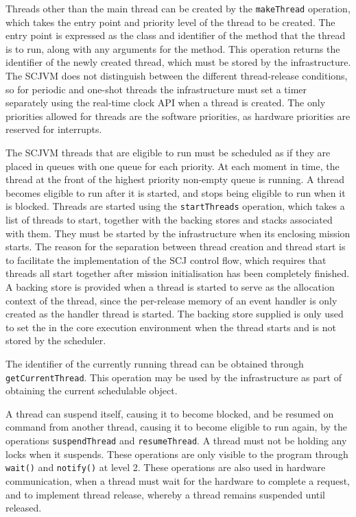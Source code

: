 Threads other than the main thread can be created by the
\texttt{makeThread} operation, which takes the entry point and
priority level of the thread to be created.
The entry point is expressed as the class and identifier of the method
that the thread is to run, along with any arguments for the method.
This operation returns the identifier of the newly created thread,
which must be stored by the infrastructure.
The SCJVM does not distinguish between the different thread-release
conditions, so for periodic and one-shot threads the infrastructure
must set a timer separately using the real-time clock API when a
thread is created.
The only priorities allowed for threads are the software priorities,
as hardware priorities are reserved for interrupts.

The SCJVM threads that are eligible to run must be scheduled as if
they are placed in queues with one queue for each priority.
At each moment in time, the thread at the front of the highest
priority non-empty queue is running.
A thread becomes eligible to run after it is started, and stops being
eligible to run when it is blocked.
Threads are started using the \texttt{start\-Threads} operation, which
takes a list of threads to start, together with the backing stores and
stacks associated with them.
They must be started by the infrastructure when its enclosing mission
starts.
The reason for the separation between thread creation and thread start
is to facilitate the implementation of the SCJ control flow, which
requires that threads all start together after mission initialisation
has been completely finished.
A backing store is provided when a thread is started to serve as the
allocation context of the thread, since the per-release memory of an
event handler is only created as the handler thread is started.
The backing store supplied is only used to set the in the
core execution environment when the thread starts and is not stored by
the scheduler.

The identifier of the currently running thread can be obtained through
\texttt{get\-Current\-Thread}.
This operation may be used by the infrastructure as part of obtaining
the current schedulable object.

A thread can suspend itself, causing it to become blocked, and be
resumed on command from another thread, causing it to become eligible
to run again, by the operations \texttt{suspend\-Thread} and
\texttt{resume\-Thread}.
A thread must not be holding any locks when it suspends.
These operations are only visible to the program through
\texttt{wait()} and \texttt{notify()} at level 2.
These operations are also used in hardware communication, when a
thread must wait for the hardware to complete a request, and to
implement thread release, whereby a thread remains suspended until
released.

